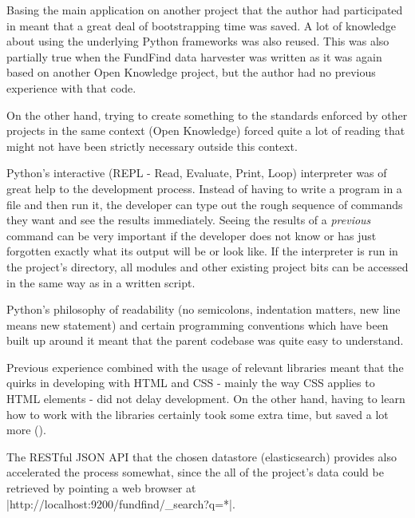 
Basing the main application on another project that the author had participated in meant that a great deal of bootstrapping time was saved. A lot of knowledge about using the underlying Python frameworks was also reused. This was also partially true when the FundFind data harvester was written as it was again based on another Open Knowledge project, but the author had no previous experience with that code.

On the other hand, trying to create something to the standards enforced by other projects in the same context (Open Knowledge) forced quite a lot of reading that might not have been strictly necessary outside this context.

Python's interactive (REPL - Read, Evaluate, Print, Loop) interpreter was of great help to the development process. Instead of having to write a program in a file and then run it, the developer can type out the rough sequence of commands they want and see the results immediately. Seeing the results of a \emph{previous} command can be very important if the developer does not know or has just forgotten exactly what its output will be or look like. If the interpreter is run in the project's directory, all modules and other existing project bits can be accessed in the same way as in a written script.

Python's philosophy of readability (no semicolons, indentation matters, new line means new statement) and certain programming conventions which have been built up around it meant that the parent codebase was quite easy to understand.

Previous experience combined with the usage of relevant libraries meant that the quirks in developing with HTML and CSS - mainly the way CSS applies to HTML elements - did not delay development. On the other hand, having to learn how to work with the libraries certainly took some extra time, but saved a lot more ().

The RESTful JSON API that the chosen datastore (elasticsearch) provides also accelerated the process somewhat, since the all of the project's data could be retrieved by pointing a web browser at
\\ |http://localhost:9200/fundfind/_search?q=*|.


